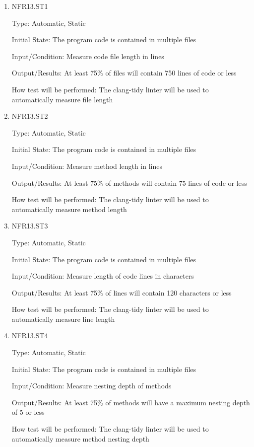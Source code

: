 \documentclass[12pt, titlepage]{article}
\begin{document}
\begin{enumerate}

\item{NFR13.ST1\\}

Type: Automatic, Static

Initial State: The program code is contained in multiple files

Input/Condition: Measure code file length in lines

Output/Results: At least 75\% of files will contain 750 lines of code or less

How test will be performed: The clang-tidy linter will be used to automatically measure file length

\item{NFR13.ST2\\}

Type: Automatic, Static

Initial State: The program code is contained in multiple files

Input/Condition: Measure method length in lines

Output/Results: At least 75\% of methods will contain 75 lines of code or less

How test will be performed: The clang-tidy linter will be used to automatically measure method length

\item{NFR13.ST3\\}

Type: Automatic, Static

Initial State: The program code is contained in multiple files

Input/Condition: Measure length of code lines in characters

Output/Results: At least 75\% of lines will contain 120 characters or less

How test will be performed: The clang-tidy linter will be used to automatically measure line length

\item{NFR13.ST4\\}

Type: Automatic, Static

Initial State: The program code is contained in multiple files

Input/Condition: Measure nesting depth of methods

Output/Results: At least 75\% of methods will have a maximum nesting depth of 5 or less

How test will be performed: The clang-tidy linter will be used to automatically measure method nesting depth

\end{enumerate}
\end{document}
